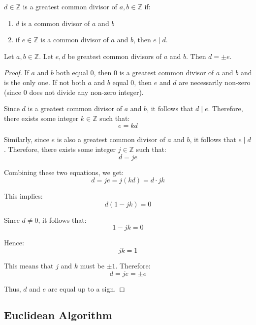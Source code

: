 \documentclass[11pt, draft]{article}
\begin{document}
\begin{definition}
    \(d \in \mathbb{Z}\) is a greatest common divisor of \(a, b \in \mathbb{Z}\) if:
    \begin{enumerate}
        \item \(d\) is a common divisor of \(a\) and \(b\)
        \item if \(e \in \mathbb{Z}\) is a common divisor of \(a\) and \(b\), then \(e \mid
              d\).
    \end{enumerate}
\end{definition}
\begin{lemma}
    Let \(a, b \in \mathbb{Z}\). Let \(e, d\) be greatest common divisors of \(a\) and \(b\). Then \(d = \pm e\).
\end{lemma}

\begin{proof}
    If \(a\) and \(b\) both equal \(0\), then \(0\) is a greatest common divisor of \(a\) and \(b\) and is the only one. If not both \(a\) and \(b\) equal \(0\), then \(e\) and \(d\) are necessarily non-zero (since \(0\) does not divide any non-zero integer).

    Since \(d\) is a greatest common divisor of \(a\) and \(b\), it follows that
    \(d \mid e\). Therefore, there exists some integer \(k \in \mathbb{Z}\) such
    that:
    \[ e = kd \]

    Similarly, since \(e\) is also a greatest common divisor of \(a\) and \(b\), it
    follows that \(e \mid d\). Therefore, there exists some integer \(j \in
    \mathbb{Z}\) such that:
    \[ d = je \]

    Combining these two equations, we get:
    \[ d = je = j(kd) = d \cdot jk \]

    This implies:
    \[ d(1 - jk) = 0 \]

    Since \(d \neq 0\), it follows that:
    \[ 1 - jk = 0 \]

    Hence:
    \[ jk = 1 \]

    This means that \(j\) and \(k\) must be \(\pm 1\). Therefore:
    \[ d = je = \pm e \]

    Thus, \(d\) and \(e\) are equal up to a sign.
\end{proof}
\subsection{Euclidean Algorithm}
\end{document}
